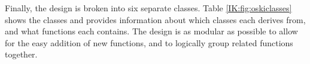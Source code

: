 Finally, the design is broken into six separate classes.
Table \ref{IK:fig:oskiclasses} shows the classes and provides information about which classes each
derives from, and what functions each contains.  The design is as modular as possible to allow
for the easy addition of new functions, and to logically group related functions together.





  
  













